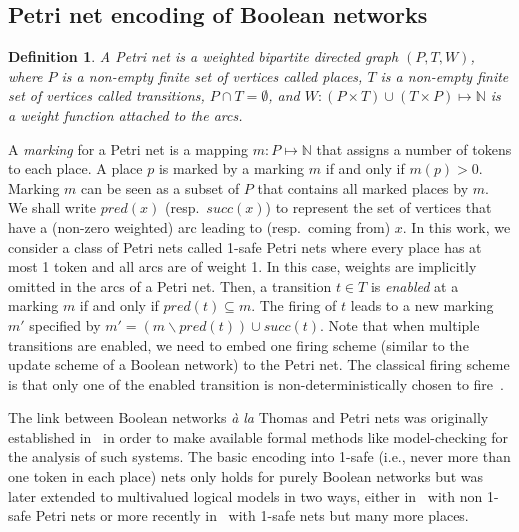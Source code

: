 \documentclass[preprint,12pt]{elsarticle}
\newtheorem{definition}{Definition}[section]
\begin{document}
\subsection{Petri net encoding of Boolean networks}%
\label{sec:encoding}

\begin{definition}

  A \emph{Petri net} is a weighted bipartite directed graph \((P, T, W)\),
  where \(P\) is a non-empty finite set of vertices called \emph{places},
  \(T\) is a non-empty finite set of vertices called \emph{transitions},
  \(P \cap T = \emptyset\),
  and \(W : (P \times T) \cup (T \times P) \mapsto \mathbb{N} \) is a weight function attached to the arcs.

\end{definition}
A \emph{marking} for a Petri net is a mapping \(m : P \mapsto \mathbb{N}\) that assigns a number of tokens to each place. 
A place \(p\) is marked by a marking \(m\) if and only if \(m(p) > 0\). 
Marking \(m\) can be seen as a subset of \(P\) that contains all marked places by \(m\).
We shall write \(pred(x)\) (resp.\ \(succ(x)\)) to represent the set of vertices that have a (non-zero weighted) arc leading to (resp.\ coming from) \(x\).
In this work, we consider a class of Petri nets called 1-safe Petri nets where every place has at most 1 token and all arcs are of weight 1.
In this case, weights are implicitly omitted in the arcs of a Petri net.
Then, a transition \(t \in T\) is \emph{enabled} at a marking \(m\) if and only if \(pred(t) \subseteq m\). 
The firing of \(t\) leads to a new marking \(m'\) specified by \(m' = (m \backslash pred(t)) \cup succ(t)\).
Note that when multiple transitions are enabled, we need to embed one firing scheme (similar to the update scheme of a Boolean network) to the Petri net.
The classical firing scheme is that only one of the enabled transition is non-deterministically chosen to fire~\cite{Murata1989}.

The link between Boolean networks \emph{à la} Thomas and Petri nets was originally established in~\cite{chaouiya2004qualitative} in order to make available formal methods like model-checking for the analysis of such systems.
The basic encoding into 1-safe (i.e., never more than one token in each place) nets only holds for purely Boolean networks but was later extended to multivalued logical models in two ways, either in~\cite{chaouiya2011petri} with non 1-safe Petri nets or more recently in~\cite{chatain2014characterization} with 1-safe nets but many more places.
\end{document}
